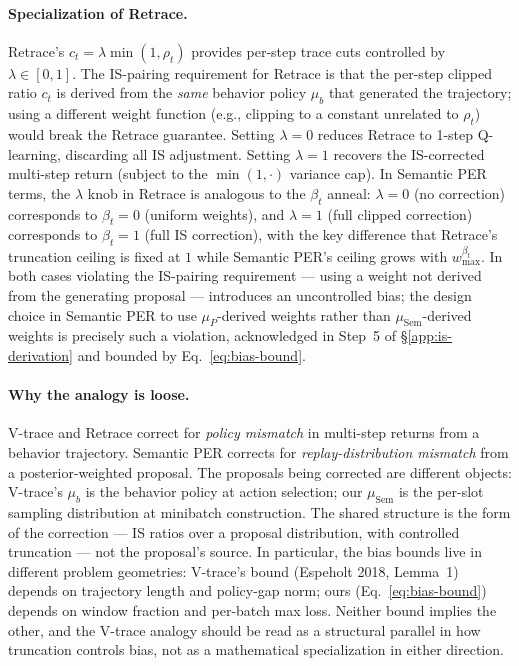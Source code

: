 \paragraph{Specialization of Retrace.}
Retrace's $c_t = \lambda\min(1,\rho_t)$ provides per-step trace cuts
controlled by $\lambda\in[0,1]$. The IS-pairing requirement for Retrace
is that the per-step clipped ratio $c_t$ is derived from the \emph{same}
behavior policy $\mu_b$ that generated the trajectory; using a different
weight function (e.g., clipping to a constant unrelated to $\rho_t$)
would break the Retrace guarantee. Setting $\lambda=0$ reduces Retrace to
1-step Q-learning, discarding all IS adjustment. Setting $\lambda=1$
recovers the IS-corrected multi-step return (subject to the $\min(1,\cdot)$
variance cap). In Semantic PER terms, the $\lambda$ knob in Retrace is
analogous to the $\beta_t$ anneal: $\lambda=0$ (no correction) corresponds
to $\beta_t=0$ (uniform weights), and $\lambda=1$ (full clipped correction)
corresponds to $\beta_t=1$ (full IS correction), with the key difference
that Retrace's truncation ceiling is fixed at $1$ while Semantic PER's
ceiling grows with $w_{\max}^{\beta_t}$. In both cases violating the
IS-pairing requirement --- using a weight not derived from the generating
proposal --- introduces an uncontrolled bias; the design choice in Semantic
PER to use $\mu_P$-derived weights rather than $\mu_{\text{Sem}}$-derived
weights is precisely such a violation, acknowledged in Step~5 of
\S\ref{app:is-derivation} and bounded by Eq.~\eqref{eq:bias-bound}.

\paragraph{Why the analogy is loose.}
V-trace and Retrace correct for \emph{policy mismatch} in multi-step
returns from a behavior trajectory. Semantic PER corrects for
\emph{replay-distribution mismatch} from a posterior-weighted proposal.
The proposals being corrected are different objects: V-trace's $\mu_b$
is the behavior policy at action selection; our $\mu_{\text{Sem}}$ is
the per-slot sampling distribution at minibatch construction. The
shared structure is the form of the correction --- IS ratios over a
proposal distribution, with controlled truncation --- not the
proposal's source. In particular, the bias bounds live in different
problem geometries: V-trace's bound (Espeholt 2018, Lemma~1) depends
on trajectory length and policy-gap norm; ours (Eq.~\eqref{eq:bias-bound})
depends on window fraction and per-batch max loss. Neither bound implies
the other, and the V-trace analogy should be read as a structural
parallel in how truncation controls bias, not as a mathematical
specialization in either direction.

